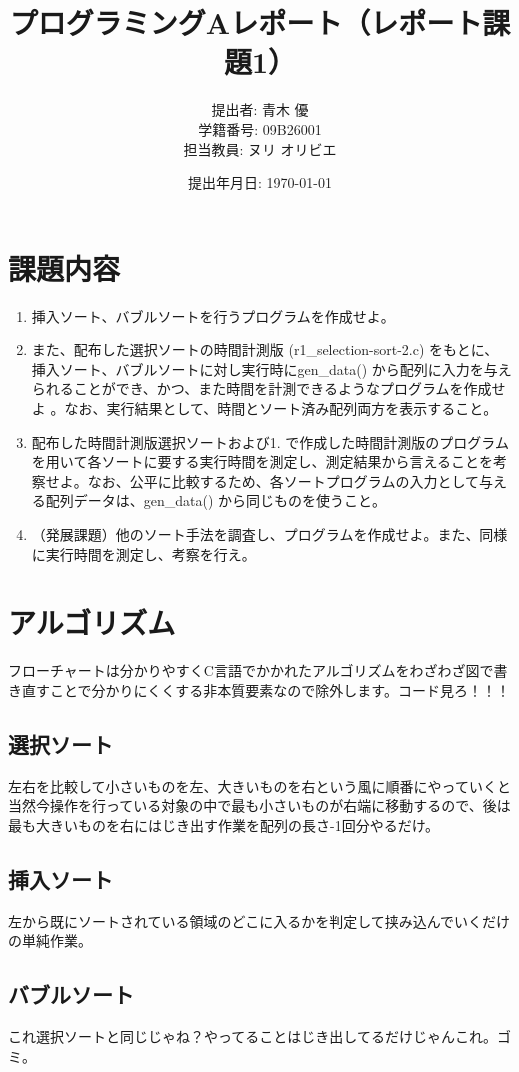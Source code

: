 \documentclass[dvipdfmx, a4paper, titlepage]{jsarticle}
\title{プログラミングAレポート（レポート課題1）}
\author{提出者: 青木 優 \\ 学籍番号: 09B26001 \\ 担当教員: ヌリ オリビエ}
\date{提出年月日: \today}
\begin{document}
\maketitle

\section{課題内容}
\begin{enumerate}
  \item 挿入ソート、バブルソートを行うプログラムを作成せよ。
  \item また、配布した選択ソートの時間計測版 (r1\_selection-sort-2.c) をもとに、挿入ソート、バブルソートに対し実行時にgen\_data() から配列に入力を与えられることができ、かつ、また時間を計測できるようなプログラムを作成せよ 。なお、実行結果として、時間とソート済み配列両方を表示すること。
  \item 配布した時間計測版選択ソートおよび1. で作成した時間計測版のプログラムを用いて各ソートに要する実行時間を測定し、測定結果から言えることを考察せよ。なお、公平に比較するため、各ソートプログラムの入力として与える配列データは、gen\_data() から同じものを使うこと。
  \item （発展課題）他のソート手法を調査し、プログラムを作成せよ。また、同様に実行時間を測定し、考察を行え。
\end{enumerate}

\section{アルゴリズム}
\label{sec:algorithm}
フローチャートは分かりやすくC言語でかかれたアルゴリズムをわざわざ図で書き直すことで分かりにくくする非本質要素なので除外します。コード見ろ！！！
\subsection{選択ソート}
左右を比較して小さいものを左、大きいものを右という風に順番にやっていくと当然今操作を行っている対象の中で最も小さいものが右端に移動するので、後は最も大きいものを右にはじき出す作業を配列の長さ-1回分やるだけ。
\subsection{挿入ソート}
左から既にソートされている領域のどこに入るかを判定して挟み込んでいくだけの単純作業。
\subsection{バブルソート}
これ選択ソートと同じじゃね？やってることはじき出してるだけじゃんこれ。ゴミ。
\end{document}
